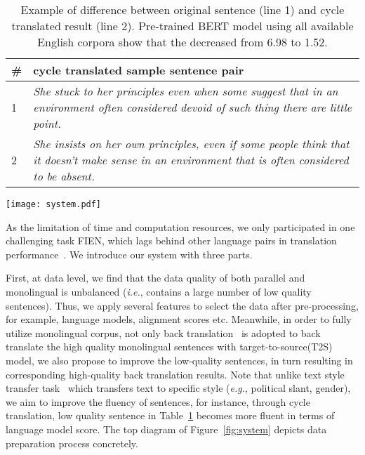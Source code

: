 \documentclass[11pt,a4paper]{article}
\begin{document}
    \begin{table}[t!]
    \begin{center}
    \begin{tabular}{|l|p{6.4cm}|}
    \hline 
    \# & \textbf{cycle translated sample sentence pair}\\
    \hline
    1 & \textit{She stuck to her principles even when some suggest that in an environment often considered devoid of such thing there are little point.}\\ 
    \hline
    2 & \textit{She insists on her own principles, even if some people think that it doesn't make sense in an environment that is often considered to be absent.}\\ 
    \hline
    \end{tabular}
    \end{center}
    \caption{\label{tab:sentences}Example of difference between original sentence (line 1) and cycle translated result (line 2). Pre-trained BERT model using all available English corpora show that the  decreased from 6.98 to 1.52.}
    \end{table}
  
\begin{figure*}[htb]
    \centering
    \texttt{[image: system.pdf]}
    \caption{The schematic structure of the three main stages of the USYD-NMT. They are data preparation stage, model training stage and inference phrase. For brevity, here Mono, Para, and Valid represent the monolingual, parallel and validation data respectively.}
    \label{fig:system}
\end{figure*}
  
  As the limitation of time and computation resources, we only participated in one challenging task FIEN, which lags behind other language pairs in translation performance~\cite{bojar-etal-2018-findings}. We introduce our system with three parts. 
  
  First, at data level, we find that the data quality of both parallel and monolingual is unbalanced (\textit{i.e.}, contains a large number of low quality sentences). Thus, we apply several features to select the data after pre-processing, for example, language models, alignment scores etc. Meanwhile, in order to fully utilize monolingual corpus, not only back translation~\cite{sennrich2015improving} is adopted to back translate the high quality monolingual sentences with target-to-source(T2S) model, we also propose  to improve the low-quality sentences, in turn resulting in corresponding high-quality back translation results. Note that unlike text style transfer task~\cite{shen2017style,fu2018style,prabhumoye2018style} which transfers text to specific style (\textit{e.g.}, political slant, gender), we aim to improve the fluency of sentences, for instance, through cycle translation, low quality sentence in Table~\ref{tab:sentences} becomes more fluent in terms of language model score. The top diagram of Figure~\ref{fig:system} depicts data preparation process concretely.
  
\end{document}
